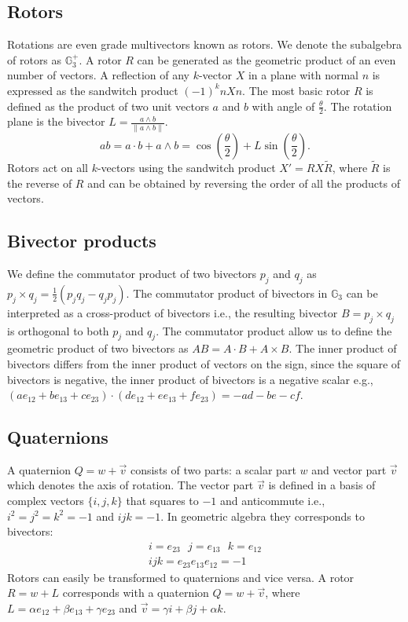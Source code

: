 \documentclass{birkjour}
\numberwithin{equation}{section}
\begin{document}
\subsection{Rotors}

Rotations are even grade multivectors known as rotors. We denote the subalgebra of rotors as $\mathbb{G}^{+}_3$. A rotor $R$ can be generated as the geometric product of an even number of vectors. A reflection of any $k$-vector $X$ in a plane with normal $n$ is expressed as the sandwitch product $(-1)^k n X n$. The most basic rotor $R$ is defined as the product of two unit vectors $a$ and $b$ with angle of $\frac{\theta}{2}$. The rotation plane is the bivector $L = \frac{a \wedge b}{\| a \wedge b \|}$.
\begin{equation}
a b = a \cdot b + a \wedge b = \cos\left( \frac{\theta}{2} \right) + L \sin\left( \frac{\theta}{2} \right).
\end{equation}
Rotors act on all $k$-vectors using the sandwitch product $X' = R X \tilde R$, where $\tilde R$ is the reverse of $R$ and can be obtained by reversing the order of all the products of vectors.

\subsection{Bivector products}

We define the commutator product of two bivectors $p_j$ and $q_j$ as $p_j \times q_j = \frac{1}{2}(p_j q_j - q_j p _j)$. The commutator product of bivectors in $\mathbb{G}_3$  can be interpreted as a cross-product of bivectors i.e., the resulting bivector $B = p_j \times q_j$ is orthogonal to both $p_j$ and $q_j$. The commutator product allow us to define the geometric product of two bivectors as $A B = A \cdot B + A \times B$. The inner product of bivectors differs from the inner product of vectors on the sign, since the square of bivectors is negative, the inner product of bivectors is a negative scalar e.g., $(a e_{12} + b e_{13} + c e_{23}) \cdot (d e_{12} + e e_{13} + f e_{23}) = -a d - b e - c f$.

\subsection{Quaternions}

A quaternion $Q = w + \vec v$ consists of two parts: a scalar part $w$ and vector part $\vec v$ which denotes the axis of rotation. The vector part $\vec v$ is defined in a basis of complex vectors $\{ i, j, k \}$ that squares to $-1$ and anticommute i.e., $i^2 = j^2 = k^2 = -1$ and $i j k = -1$. In geometric algebra they corresponds to bivectors:
\begin{eqnarray}
i = e_{23} \ \ \ j = e_{13} \ \ \  k = e_{12} \\
ijk = e_{23} e_{13} e_{12} = -1 \nonumber
\end{eqnarray}
Rotors can easily be transformed to quaternions and vice versa. A rotor $R = w + L$ corresponds with a quaternion $Q = w + \vec v$, where $L = \alpha e_{12} + \beta e_{13} + \gamma e_{23}$ and $\vec v = \gamma i + \beta j + \alpha k$.
\end{document}
